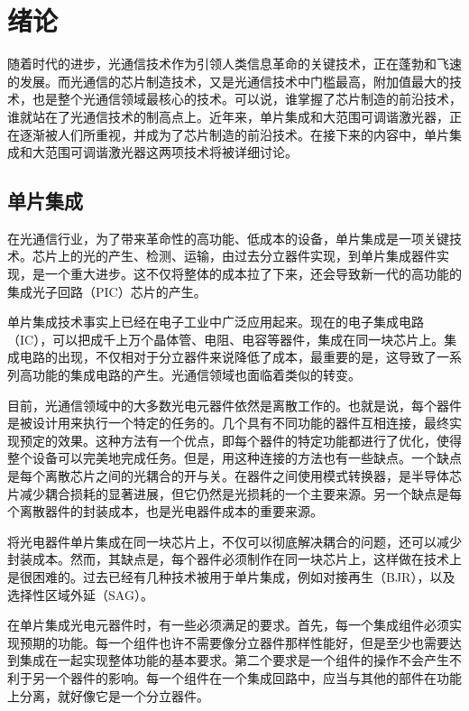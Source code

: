 \documentclass{ZJUthesis}
\begin{document}
\ZJUcontents

\ZJUmainmatter

\chapter{绪论}

随着时代的进步，光通信技术作为引领人类信息革命的关键技术，正在蓬勃和飞速的发展。而光通信的芯片制造技术，又是光通信技术中门槛最高，附加值最大的技术，也是整个光通信领域最核心的技术。可以说，谁掌握了芯片制造的前沿技术，谁就站在了光通信技术的制高点上。近年来，单片集成和大范围可调谐激光器，正在逐渐被人们所重视，并成为了芯片制造的前沿技术。在接下来的内容中，单片集成和大范围可调谐激光器这两项技术将被详细讨论。

\section{单片集成}

在光通信行业，为了带来革命性的高功能、低成本的设备，单片集成是一项关键技术。芯片上的光的产生、检测、运输，由过去分立器件实现，到单片集成器件实现，是一个重大进步。这不仅将整体的成本拉了下来，还会导致新一代的高功能的集成光子回路（PIC）芯片的产生。

单片集成技术事实上已经在电子工业中广泛应用起来。现在的电子集成电路（IC），可以把成千上万个晶体管、电阻、电容等器件，集成在同一块芯片上。集成电路的出现，不仅相对于分立器件来说降低了成本，最重要的是，这导致了一系列高功能的集成电路的产生。光通信领域也面临着类似的转变。

目前，光通信领域中的大多数光电元器件依然是离散工作的。也就是说，每个器件是被设计用来执行一个特定的任务的。几个具有不同功能的器件互相连接，最终实现预定的效果。这种方法有一个优点，即每个器件的特定功能都进行了优化，使得整个设备可以完美地完成任务。但是，用这种连接的方法也有一些缺点。一个缺点是每个离散芯片之间的光耦合的开与关。在器件之间使用模式转换器，是半导体芯片减少耦合损耗的显著进展，但它仍然是光损耗的一个主要来源。另一个缺点是每个离散器件的封装成本，也是光电器件成本的重要来源。

将光电器件单片集成在同一块芯片上，不仅可以彻底解决耦合的问题，还可以减少封装成本。然而，其缺点是，每个器件必须制作在同一块芯片上，这样做在技术上是很困难的。过去已经有几种技术被用于单片集成，例如对接再生（BJR），以及选择性区域外延（SAG）。

在单片集成光电元器件时，有一些必须满足的要求。首先，每一个集成组件必须实现预期的功能。每一个组件也许不需要像分立器件那样性能好，但是至少也需要达到集成在一起实现整体功能的基本要求。第二个要求是一个组件的操作不会产生不利于另一个器件的影响。每一个组件在一个集成回路中，应当与其他的部件在功能上分离，就好像它是一个分立器件。
\end{document}
